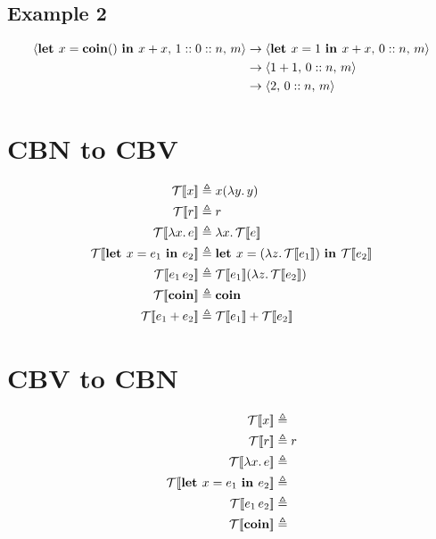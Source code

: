 \documentclass{article}
\begin{document}
	\subsection{Example 2}
			\begin{equation*}
				\begin{split}
					\langle \text{\bf let } x = {\bf coin ()} \text{ \bf in } x + x,\, 1::0::n,\, m\rangle
					&\rightarrow \langle \text{\bf let } x = 1 \text{ \bf in } x + x,\, 0::n,\, m\rangle \\
					&\rightarrow \langle 1 + 1,\, 0::n,\, m\rangle \\
					&\rightarrow \langle 2,\, 0::n,\, m\rangle \\
				\end{split}
			\end{equation*}
			
\newpage
	\section{CBN to CBV}
	\begin{equation*}
		\begin{split}
			\mathcal{T}[\![x]\!] &\triangleq x (\lambda y.\, y) \\
			\mathcal{T}[\![r]\!] &\triangleq r \\
			\mathcal{T}[\![\lambda x.\, e]\!] &\triangleq \lambda x.\, \mathcal{T}[\![e]\!] \\
			\mathcal{T}[\![\text{\bf let } x = e_1 \text{ \bf in } e_2]\!] &\triangleq \text{\bf let } x = (\lambda z.\, \mathcal{T}[\![ e_1]\!]) \text{ \bf in } \mathcal{T}[\![e_2]\!] \\
			\mathcal{T}[\![e_1\, e_2]\!] &\triangleq \mathcal{T}[\![e_1]\!] (\lambda z.\, \mathcal{T}[\![ e_2]\!])\\
			\mathcal{T}[\![{\bf coin}]\!] &\triangleq {\bf coin} \\
			\mathcal{T}[\![{ e_1 + e_2 }]\!] &\triangleq \mathcal{T}[\![{ e_1 }]\!] + \mathcal{T}[\![{ e_2 }]\!] \\
		\end{split}
	\end{equation*}
	
	\section{CBV to CBN}
	\begin{equation*}
		\begin{split}
			\mathcal{T}[\![x]\!] &\triangleq  \\
			\mathcal{T}[\![r]\!] &\triangleq r \\
			\mathcal{T}[\![\lambda x.\, e]\!] &\triangleq  \\
			\mathcal{T}[\![\text{\bf let } x = e_1 \text{ \bf in } e_2]\!] &\triangleq \\
			\mathcal{T}[\![e_1\, e_2]\!] &\triangleq \\
			\mathcal{T}[\![{\bf coin}]\!] &\triangleq \\
		\end{split}
	\end{equation*}
\end{document}
